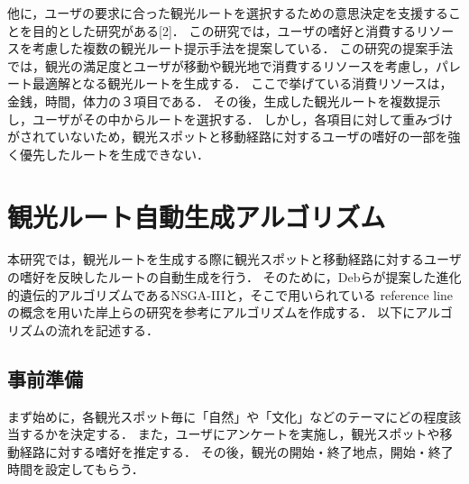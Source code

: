 他に，ユーザの要求に合った観光ルートを選択するための意思決定を支援することを目的とした研究がある[2]．
この研究では，ユーザの嗜好と消費するリソースを考慮した複数の観光ルート提示手法を提案している．
この研究の提案手法では，観光の満足度とユーザが移動や観光地で消費するリソースを考慮し，パレート最適解となる観光ルートを生成する．
ここで挙げている消費リソースは，金銭，時間，体力の３項目である．
その後，生成した観光ルートを複数提示し，ユーザがその中からルートを選択する．
しかし，各項目に対して重みづけがされていないため，観光スポットと移動経路に対するユーザの嗜好の一部を強く優先したルートを生成できない．

% 


\section{観光ルート自動生成アルゴリズム}\label{sec:観光ルート自動生成アルゴリズム}
本研究では，観光ルートを生成する際に観光スポットと移動経路に対するユーザの嗜好を反映したルートの自動生成を行う．
そのために，Debらが提案した進化的遺伝的アルゴリズムであるNSGA-I\hspace{-.1em}I\hspace{-.1em}Iと，そこで用いられている reference line の概念を用いた岸上らの研究を参考にアルゴリズムを作成する．
以下にアルゴリズムの流れを記述する．

\subsection{事前準備}\label{sec:事前準備}
まず始めに，各観光スポット毎に「自然」や「文化」などのテーマにどの程度該当するかを決定する．
また，ユーザにアンケートを実施し，観光スポットや移動経路に対する嗜好を推定する．
その後，観光の開始・終了地点，開始・終了時間を設定してもらう．
		
